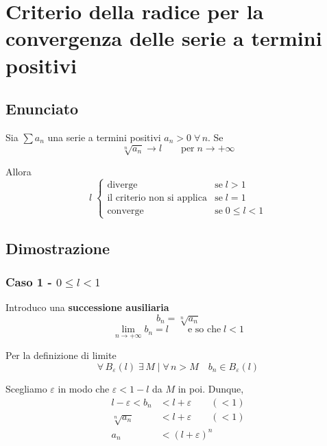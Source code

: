 \documentclass[../../dimostrazioni]{subfiles}
\begin{document}
    \chapter{Criterio della radice per la convergenza delle serie a termini positivi}
    \label{criterioRadiceSerie}

        \section*{Enunciato}

            Sia \(\sum a_n\) una serie a termini positivi \(a_n > 0 \; \forall \, n\). Se
             \[\sqrt[n]{a_n} \rightarrow l \qquad \text{per} \; n  \rightarrow +\infty \]
            
            Allora
            \[
                l \;
                \begin{cases}
                    \text{diverge} & \text{se} \; l > 1\\
                    \text{il criterio non si applica} & \text{se} \; l = 1\\
                    \text{converge} & \text{se} \; 0 \leqslant l < 1
                \end{cases}
            \]
            
        \section*{Dimostrazione}
            
            \subsection*{Caso 1 - \(0 \leqslant l < 1\)} 
                    
                Introduco una \textbf{successione ausiliaria}
                \[b_n = \sqrt[n]{a_n} \]  
                \[\lim_{n \to +\infty} b_n = l \qquad \text{e so che} \; l < 1\]

                Per la definizione di limite
                \[\forall \, B_\varepsilon (l) \; \exists \, M \mid \forall \, n > M \quad b_n \in B_\varepsilon (l) \]

                Scegliamo \(\varepsilon\) in modo che \(\varepsilon < 1 - l\) da \(M\) in poi. Dunque,
                \begin{align*}
                    l - \varepsilon < b_n &< l + \varepsilon \qquad (<1) \\
                    \sqrt[n]{a_n} &< l + \varepsilon \qquad (<1) \\
                    a_n &< (l+\varepsilon)^{n}  
                \end{align*}
                                     
\end{document}
